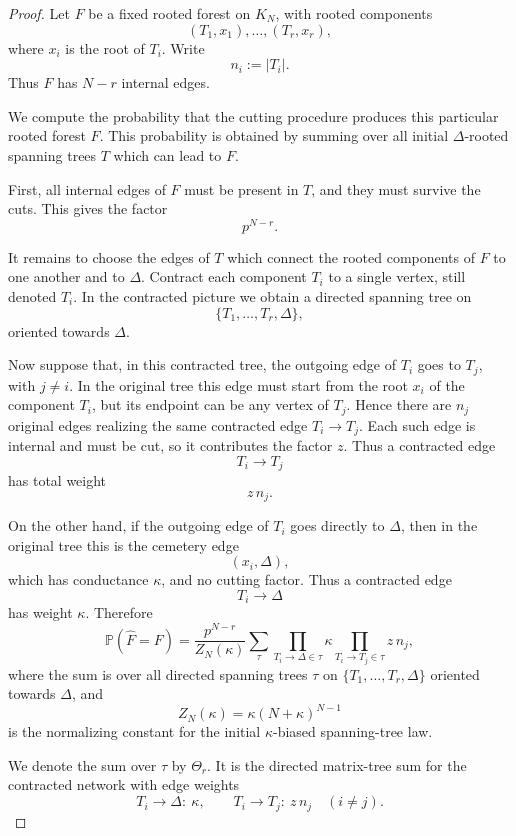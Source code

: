 \documentclass[11pt]{article}
\begin{document}
\begin{proof}


Let \(F\) be a fixed rooted forest on \(K_N\), with rooted components
\[
(T_1,x_1),\dots,(T_r,x_r),
\]
where \(x_i\) is the root of \(T_i\).  
Write
\[
n_i:=|T_i|.
\]
Thus \(F\) has \(N-r\) internal edges.

We compute the probability that the cutting procedure produces this particular
rooted forest \(F\). This probability is obtained by summing over all initial
\(\Delta\)-rooted spanning trees \(T\) which can lead to \(F\).

First, all internal edges of \(F\) must be present in \(T\), and they must
survive the cuts. This gives the factor
\[
p^{N-r}.
\]

It remains to choose the edges of \(T\) which connect the rooted components of
\(F\) to one another and to \(\Delta\). Contract each component \(T_i\) to a
single vertex, still denoted \(T_i\). In the contracted picture we obtain a
directed spanning tree on
\[
\{T_1,\dots,T_r,\Delta\},
\]
oriented towards \(\Delta\).

Now suppose that, in this contracted tree, the outgoing edge of \(T_i\) goes
to \(T_j\), with \(j\ne i\). In the original tree this edge must start from
the root \(x_i\) of the component \(T_i\), but its endpoint can be any vertex
of \(T_j\). Hence there are \(n_j\) original edges realizing the same
contracted edge \(T_i\to T_j\). Each such edge is internal and must be cut, so
it contributes the factor \(z\). Thus a contracted edge
\[
T_i\to T_j
\]
has total weight
\[
z\,n_j.
\]

On the other hand, if the outgoing edge of \(T_i\) goes directly to
\(\Delta\), then in the original tree this is the cemetery edge
\[
(x_i,\Delta),
\]
which has conductance \(\kappa\), and no cutting factor. Thus a contracted
edge
\[
T_i\to\Delta
\]
has weight
\(
\kappa
\).
Therefore
\[
\mathbb P(\widehat F=F)
=
\frac{p^{N-r}}{Z_N(\kappa)}
\sum_{\tau}
\prod_{T_i\to\Delta\in\tau}\kappa
\prod_{T_i\to T_j\in\tau} z\,n_j,
\]
where the sum is over all directed spanning trees \(\tau\) on
\(\{T_1,\dots,T_r,\Delta\}\) oriented towards \(\Delta\), and
\[
Z_N(\kappa)=\kappa(N+\kappa)^{N-1}
\]
is the normalizing constant for the initial \(\kappa\)-biased spanning-tree
law.

We denote the sum over \(\tau\) by \(\Theta_r\). It is the directed
matrix-tree sum for the contracted network with edge weights
\[
T_i\to\Delta:\ \kappa,
\qquad
T_i\to T_j:\ z\,n_j \quad (i\ne j).
\]


\end{proof}
\end{document}
